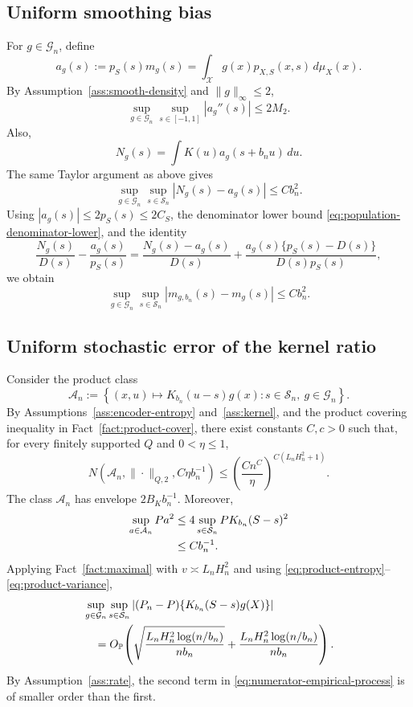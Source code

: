 \documentclass[11pt]{article}
\theoremstyle{remark}
\newcommand{\Pp}{\mathbb{P}}
\newcommand{\cX}{\mathcal{X}}
\newcommand{\cS}{\mathcal{S}}
\newcommand{\cG}{\mathcal{G}}
\newcommand{\cA}{\mathcal{A}}
\begin{document}
\subsection{Uniform smoothing bias}

For $g\in\cG_n$, define
\[
  a_g(s)
  :=
  p_S(s)m_g(s)
  =
  \int_{\cX}g(x)p_{X,S}(x,s)\,d\mu_X(x).
\]
By Assumption~\ref{ass:smooth-density} and $\|g\|_\infty\le2$,
\begin{equation}
  \sup_{g\in\cG_n}\sup_{s\in[-1,1]}|a_g''(s)|
  \le
  2M_2.
  \label{eq:ag-second-derivative}
\end{equation}
Also,
\[
  N_g(s)
  =
  \int K(u)a_g(s+b_nu)\,du.
\]
The same Taylor argument as above gives
\begin{equation}
  \sup_{g\in\cG_n}\sup_{s\in\cS_n}
  |N_g(s)-a_g(s)|
  \le Cb_n^2.
  \label{eq:numerator-bias}
\end{equation}
Using $|a_g(s)|\le2p_S(s)\le2C_S$, the denominator lower bound
\eqref{eq:population-denominator-lower}, and the identity
\[
  \frac{N_g(s)}{D(s)}-\frac{a_g(s)}{p_S(s)}
  =
  \frac{N_g(s)-a_g(s)}{D(s)}
  +
  \frac{a_g(s)\{p_S(s)-D(s)\}}{D(s)p_S(s)},
\]
we obtain
\begin{equation}
  \sup_{g\in\cG_n}\sup_{s\in\cS_n}
  |m_{g,b_n}(s)-m_g(s)|
  \le Cb_n^2.
  \label{eq:ratio-bias}
\end{equation}

\subsection{Uniform stochastic error of the kernel ratio}

Consider the product class
\[
  \cA_n
  :=
  \left\{
    (x,u)\mapsto K_{b_n}(u-s)g(x):
    s\in\cS_n,\ g\in\cG_n
  \right\}.
\]
By Assumptions~\ref{ass:encoder-entropy} and~\ref{ass:kernel}, and the product
covering inequality in Fact~\ref{fact:product-cover}, there exist constants
$C,c>0$ such that, for every finitely supported $Q$ and $0<\eta\le1$,
\begin{equation}
  N\!\left(
    \cA_n,\|\cdot\|_{Q,2},C\eta b_n^{-1}
  \right)
  \le
  \left(
    \frac{Cn^C}{\eta}
  \right)^{C(L_nH_n^2+1)}.
  \label{eq:product-entropy}
\end{equation}
The class $\cA_n$ has envelope $2B_Kb_n^{-1}$.  Moreover,
\begin{align}
  \sup_{a\in\cA_n}Pa^2
  &\le
  4\sup_{s\in\cS_n}P K_{b_n}(S-s)^2
  \notag\\
  &\le
  Cb_n^{-1}.
  \label{eq:product-variance}
\end{align}
Applying Fact~\ref{fact:maximal} with
$v\asymp L_nH_n^2$ and using \eqref{eq:product-entropy}--\eqref{eq:product-variance},
\begin{align}
  &\sup_{g\in\cG_n}\sup_{s\in\cS_n}
  \left|
    (P_n-P)\{K_{b_n}(S-s)g(X)\}
  \right|
  \notag\\
  &\quad=
  O_{\Pp}\!\left(
    \sqrt{
      \frac{L_nH_n^2\log(n/b_n)}{nb_n}
    }
    +
    \frac{L_nH_n^2\log(n/b_n)}{nb_n}
  \right).
  \label{eq:numerator-empirical-process}
\end{align}
By Assumption~\ref{ass:rate}, the second term in
\eqref{eq:numerator-empirical-process} is of smaller order than the first.
\end{document}
